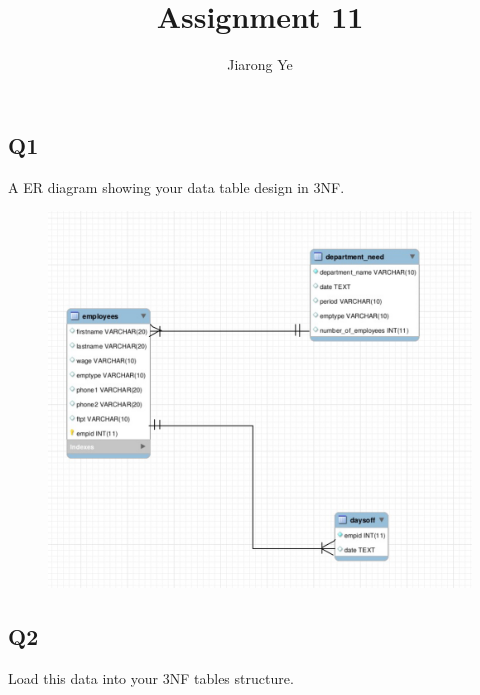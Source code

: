 \documentclass[11pt]{article}
\title{Assignment 11}
\author{Jiarong Ye}
\makeatletter
\def\maxwidth{\ifdim\Gin@nat@width>\linewidth\linewidth
    \else\Gin@nat@width\fi}
\let\Oldincludegraphics\includegraphics
\renewcommand{\includegraphics}[1]{\Oldincludegraphics[width=.8\maxwidth]{#1}}
\makeatother
\begin{document}
    
    
    \maketitle
    
    

    
    \subsection*{Q1}\label{q1}

A ER diagram showing your data table design in 3NF.

    \begin{figure}[H]
\centering
\includegraphics{1.png}
\caption{}
\end{figure}

    \subsection*{Q2}\label{q2}

Load this data into your 3NF tables structure.
\end{document}
